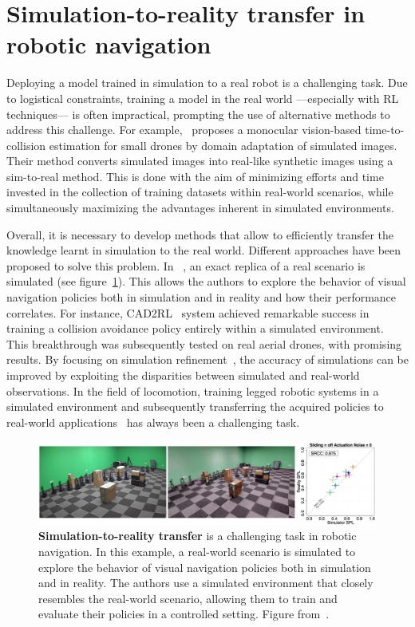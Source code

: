 \section{Simulation-to-reality transfer in robotic navigation}\label{sec:simulation-to-reality-transfer-in-robotic-navigation}
Deploying a model trained in simulation to a real robot is a challenging task.
Due to logistical constraints, training a model in the real world —especially with RL techniques— is often impractical, prompting the use of alternative methods to address this challenge.
For example,~\cite{kim2022} proposes a monocular vision-based time-to-collision estimation for small drones by domain adaptation of simulated images.
Their method converts simulated images into real-like synthetic images using a sim-to-real method.
This is done with the aim of minimizing efforts and time invested in the collection of training datasets within real-world scenarios, while simultaneously maximizing the advantages inherent in simulated environments.

Overall, it is necessary to develop methods that allow to efficiently transfer the knowledge learnt in simulation to the real world.
Different approaches have been proposed to solve this problem.
In ~\cite{kadian2020}, an exact replica of a real scenario is simulated (see figure~\ref{fig:sim2real}).
This allows the authors to explore the behavior of visual navigation policies both in simulation and in reality and how their performance correlates.
For instance, CAD2RL~\cite{sadeghiCAD2RLRealSingleImage2017} system achieved remarkable success in training a collision avoidance policy entirely within a simulated environment.
This breakthrough was subsequently tested on real aerial drones, with promising results.
By focusing on simulation refinement~\cite{Son2020}, the accuracy of simulations can be improved by exploiting the disparities between simulated and real-world observations.
In the field of locomotion, training legged robotic systems in a simulated environment and subsequently transferring the acquired policies to real-world applications~\cite{Hwangbo_2019, agarwal2022} has always been a challenging task.

\begin{figure}
    \includegraphics[width=\textwidth]{figures/related_work/sim2real}
    \caption{\textbf{Simulation-to-reality transfer} is a challenging task in robotic navigation.
    In this example, a real-world scenario is simulated to explore the behavior of visual navigation policies both in simulation and in reality.
    The authors use a simulated environment that closely resembles the real-world scenario, allowing them to train and evaluate their policies in a controlled setting.
    Figure from~\cite{kadian2020}.}
    \label{fig:sim2real}
\end{figure}

